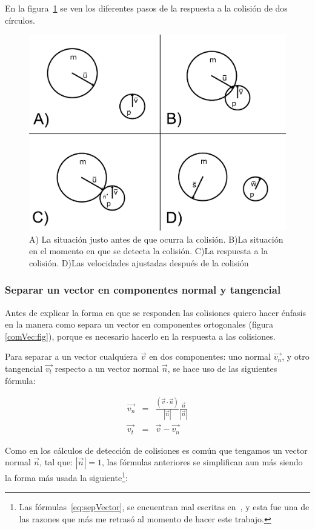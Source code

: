 En la figura~\ref{colision:fig} se ven los diferentes pasos de la respuesta a la colisión de dos círculos.
\begin{figure}
 \centering
 \includegraphics[]{Img/colisiones}
 \caption[Colisión elástica]{A) La situación justo antes de que ocurra la colisión. B)La situación en el momento en que se detecta la colisión. C)La respuesta a la colisión. D)Las velocidades ajustadas después de la colisión} 
 \label{colision:fig}
\end{figure}

\subsubsection{Separar un vector en componentes normal y tangencial}
Antes de explicar la forma en que se responden las colisiones quiero hacer énfasis en la manera como separa un vector en componentes ortogonales (figura \ref{comVec:fig}), porque es necesario hacerlo en la respuesta a las colisiones.

Para separar a un vector cualquiera $\vec{v}$ en dos componentes: uno normal $\vec{v_n}$, y otro tangencial $\vec{v_t}$ respecto a un vector normal $\vec{n}$, se hace uso de las siguientes fórmula:

\begin{eqnarray}
\vec{v_n} & = &\frac{(\vec{v} \cdot \vec{n})}{|\vec{n}|} \frac{\vec{n}}{|\vec{n}|} \nonumber \\
\vec{v_t} & = & \vec{v} - \vec{v_n} \nonumber
\end{eqnarray}

Como en los cálculos de detección de colisiones es común que tengamos un vector normal $\vec{n}$, tal que: $|\vec{n}| = 1$, las fórmulas anteriores se simplifican aun más siendo la forma más usada la siguiente\footnote{Las fórmulas~\ref{eq:sepVector}, se encuentran mal escritas en~\cite{BaraffWitkin:Coursenotes}, y esta fue una de las razones que más me retrasó al momento de hacer este trabajo.}:

